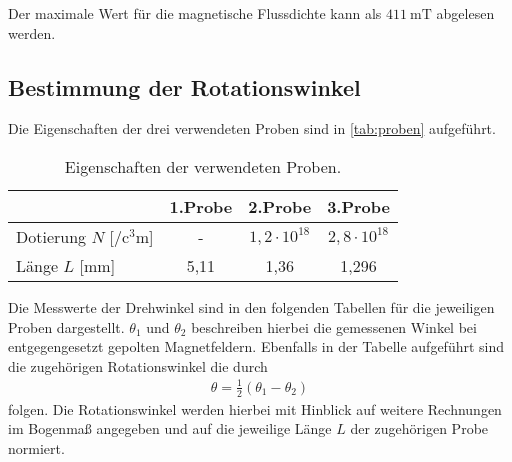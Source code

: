 \noindent
Der maximale Wert für die magnetische Flussdichte kann als $\SI{411}{\milli\tesla}$ abgelesen werden.

\subsection{Bestimmung der Rotationswinkel}
\label{subsec:Rotationswinkel}

Die Eigenschaften der drei verwendeten Proben sind in \autoref{tab:proben} aufgeführt.


\begin{table}[H]
  \caption{Eigenschaften der verwendeten Proben.}
  \label{tab:proben}
  \centering
  \begin{tabular}{l | c c c}
      & 1.Probe & 2.Probe & 3.Probe \\
      \hline
      Dotierung $N$ [$\si{\per\cubic\centi\metre}$] & - & $1,2 \cdot 10^{18}$   & $2,8 \cdot 10^{18}$ \\
      Länge $L$ [$\si{\milli\metre}$] & 5,11 & 1,36 & 1,296 \\
    \end{tabular}
\end{table}

\noindent
Die Messwerte der Drehwinkel sind in den folgenden Tabellen für die jeweiligen Proben dargestellt. $\theta_{1}$ und $\theta_{2}$ beschreiben hierbei die gemessenen Winkel bei
entgegengesetzt gepolten Magnetfeldern. Ebenfalls in der Tabelle aufgeführt sind die zugehörigen Rotationswinkel die durch 
\begin{align*}
  \theta = \frac{1}{2} (\theta_1 - \theta_2)
\end{align*}
\noindent
folgen. Die Rotationswinkel werden hierbei mit Hinblick auf weitere Rechnungen im Bogenmaß angegeben und auf die jeweilige Länge $L$ der zugehörigen Probe normiert.

